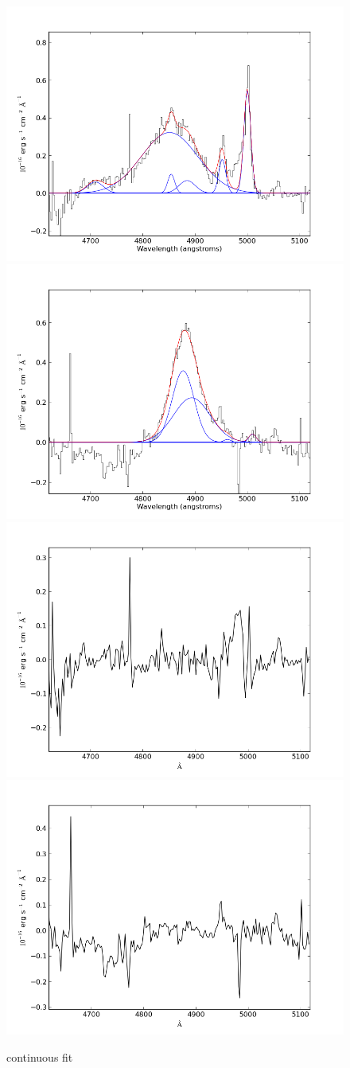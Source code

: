 \documentclass[usenatbib]{mn2e}
\begin{document}
\newpage

\begin{figure}
\begin{center}
\includegraphics[width=0.46\linewidth,angle=0]{Hbeta_2.png}
\vspace{5mm}
\includegraphics[width=0.49\linewidth,angle=0]{Hbeta_3.png}\\
\includegraphics[width=0.46\linewidth,angle=0]{Hbeta_res_2.png}
\hspace{5mm}
\includegraphics[width=0.49\linewidth,angle=0]{Hbeta_res_3.png}\\
\end{center} 
\caption{continuous fit \label{fig:landscape}}   
\end{figure}
\end{document}
